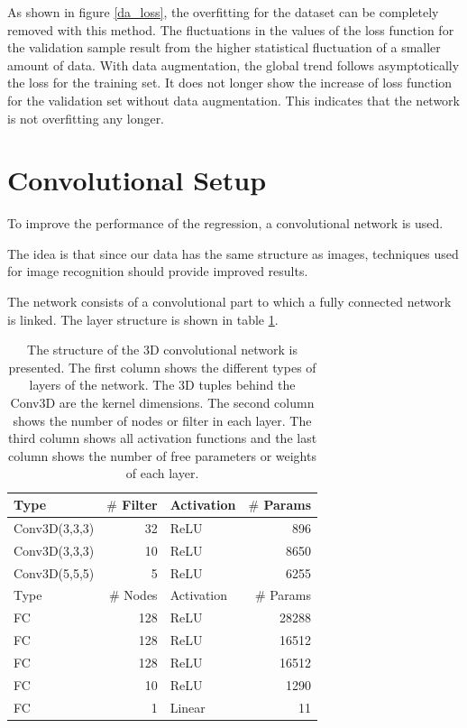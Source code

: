 \documentclass[12pt, a4paper]{thesis}
\begin{document}
As shown in figure \ref{da_loss}, the overfitting for the dataset can
be completely removed with this method.  The fluctuations in the
values of the loss function for the validation sample result from the
higher statistical fluctuation of a smaller amount of data. With data
augmentation, the global trend follows asymptotically the loss for the
training set. It does not longer show the increase of loss function
for the validation set without data augmentation. This indicates that
the network is not overfitting any longer.

\clearpage
\section{Convolutional Setup}

To improve the performance of the regression, a convolutional network
is used.

The idea is that since our data has the same structure as images,
techniques used for image recognition should provide improved results.

The network consists of a convolutional part to which a fully
connected network is linked. The layer structure is shown in table
\ref{conv_structure}.

\begin{table}[htbp]
  \centering
  \begin{tabular}{lrlr}
    Type & \(\#\) Filter & Activation & \(\#\) Params\\
    \hline
    Conv3D(3,3,3) & 32 & ReLU & 896\\
    Conv3D(3,3,3) & 10 & ReLU & 8650\\
    Conv3D(5,5,5) & 5 & ReLU & 6255\\
    \hline
    Type & \(\#\) Nodes & Activation & \(\#\) Params\\
    \hline
    FC & 128 & ReLU & 28288\\
    FC & 128 & ReLU & 16512\\
    FC & 128 & ReLU & 16512\\
    FC & 10 & ReLU & 1290\\
    FC & 1 & Linear & 11\\
  \end{tabular}
  \caption{The structure of the 3D convolutional network is
    presented. The first column shows the different types of layers of
    the network. The 3D tuples behind the Conv3D are the kernel
    dimensions. The second column shows the number of nodes or filter
    in each layer. The third column shows all activation functions and
    the last column shows the number of free parameters or weights of
    each layer.}
  \label{conv_structure}
\end{table}
\end{document}
